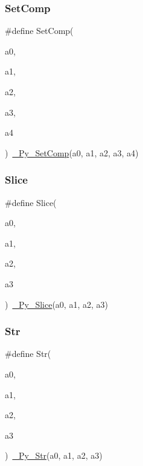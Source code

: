 \mbox{\label{_python-ast_8h_afb79ec461a79de87fb3eb00294630872}} 
\subsubsection{\texorpdfstring{SetComp}{SetComp}}
{\footnotesize\ttfamily \#define Set\+Comp(\begin{DoxyParamCaption}\item[{}]{a0,  }\item[{}]{a1,  }\item[{}]{a2,  }\item[{}]{a3,  }\item[{}]{a4 }\end{DoxyParamCaption})~\mbox{\hyperlink{_python-ast_8h_ac4460b8e0df62ceb60802eea5f299c19}{\+\_\+\+Py\+\_\+\+Set\+Comp}}(a0, a1, a2, a3, a4)}

\mbox{\label{_python-ast_8h_a239ffcf8a951a4a683fd09c8355fc888}} 
\subsubsection{\texorpdfstring{Slice}{Slice}}
{\footnotesize\ttfamily \#define Slice(\begin{DoxyParamCaption}\item[{}]{a0,  }\item[{}]{a1,  }\item[{}]{a2,  }\item[{}]{a3 }\end{DoxyParamCaption})~\mbox{\hyperlink{_python-ast_8h_a2319130e186f0697f6d7cc6d6c33b34c}{\+\_\+\+Py\+\_\+\+Slice}}(a0, a1, a2, a3)}

\mbox{\label{_python-ast_8h_a2b805f698f55c2006bea5dfbc0c582bd}} 
\subsubsection{\texorpdfstring{Str}{Str}}
{\footnotesize\ttfamily \#define Str(\begin{DoxyParamCaption}\item[{}]{a0,  }\item[{}]{a1,  }\item[{}]{a2,  }\item[{}]{a3 }\end{DoxyParamCaption})~\mbox{\hyperlink{_python-ast_8h_a2e03cfff5f4c8b214e1ca1d61fc3b5cb}{\+\_\+\+Py\+\_\+\+Str}}(a0, a1, a2, a3)}

